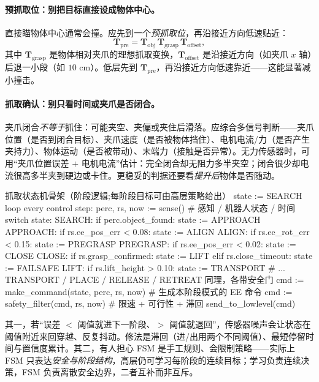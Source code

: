 \paragraph{预抓取位：别把目标直接设成物体中心。}
直接瞄物体中心通常会撞。应先到一个\emph{预抓取位}，再沿接近方向低速贴近：
\begin{equation}
  \mathbf{T}_{\mathrm{pre}}=\mathbf{T}_{\mathrm{obj}}\,\mathbf{T}_{\mathrm{grasp}}\,\mathbf{T}_{\mathrm{offset}},
  \label{eq:si-pregrasp}
\end{equation}
其中 $\mathbf{T}_{\mathrm{grasp}}$ 是物体相对夹爪的理想抓取变换，$\mathbf{T}_{\mathrm{offset}}$ 是沿接近方向（如夹爪 $x$ 轴）后退一小段（如 $10$ cm）。低层先到 $\mathbf{T}_{\mathrm{pre}}$，再沿接近方向低速靠近——这能显著减小撞击。

\paragraph{抓取确认：别只看时间或夹爪是否闭合。}
夹爪闭合\emph{不等于}抓住：可能夹空、夹偏或夹住后滑落。应综合多信号判断——夹爪位置（是否到闭合目标）、夹爪速度（是否被物体挡住）、电机电流/力（是否产生夹持力）、物体运动（是否被带动）、末端力（接触是否异常）。无力传感器时，可用“夹爪位置误差 $+$ 电机电流”估计：完全闭合却无阻力多半夹空；闭合很少却电流很高多半夹到硬边或卡住。更稳妥的判据还要看\emph{提升后}物体是否随动。

\begin{codebox}[text]{抓取状态机骨架（阶段逻辑;每阶段目标可由高层策略给出）}
state := SEARCH
loop every control step:
    perc, rs, now := sense()                      # 感知 / 机器人状态 / 时间
    switch state:
        SEARCH:    if perc.object_found:               state := APPROACH
        APPROACH:  if rs.ee_pos_err < 0.08:            state := ALIGN
        ALIGN:     if rs.ee_rot_err < 0.15:            state := PREGRASP
        PREGRASP:  if rs.ee_pos_err < 0.02:            state := CLOSE
        CLOSE:     if rs.grasp_confirmed:              state := LIFT
                   elif rs.close_timeout:             state := FAILSAFE
        LIFT:      if rs.lift_height > 0.10:           state := TRANSPORT
        # ... TRANSPORT / PLACE / RELEASE / RETREAT 同理，各带安全门
    cmd := make_command(state, perc, rs, now)     # 生成本阶段模式的 EE 命令
    cmd := safety_filter(cmd, rs, now)            # 限速 + 可行性 + 滞回
    send_to_lowlevel(cmd)
\end{codebox}

\begin{pitfall}
其一，若“误差 $<$ 阈值就进下一阶段、$>$ 阈值就退回”，传感器噪声会让状态在阈值附近来回穿越、反复抖动。修法是滞回（进/出用两个不同阈值）、最短停留时间与置信度累计。其二，有人担心 FSM 是手工规则、会限制策略——实际上 FSM 只表达\emph{安全与阶段结构}，高层仍可学习每阶段的连续目标；学习负责连续决策，FSM 负责离散安全边界，二者互补而非互斥。
\end{pitfall}

